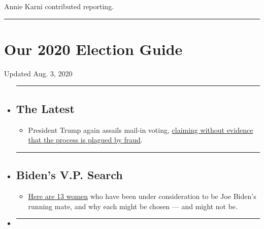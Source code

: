 Annie Karni contributed reporting.

\begin{center}\rule{0.5\linewidth}{\linethickness}\end{center}

\hypertarget{our-2020-election-guide}{%
\section{Our 2020 Election Guide}\label{our-2020-election-guide}}

Updated Aug. 3, 2020

\begin{itemize}
\item
  \begin{center}\rule{0.5\linewidth}{\linethickness}\end{center}

  \hypertarget{the-latest}{%
  \subsection{The Latest}\label{the-latest}}

  \begin{itemize}
  \tightlist
  \item
    President Trump again assails mail-in voting,
    \href{https://www.nytimes.com/2020/08/03/us/politics/trump-mail-in-voting.html?action=click\&pgtype=Article\&state=default\&region=BELOW_MAIN_CONTENT\&context=storylines_guide}{claiming
    without evidence that the process is plagued by fraud}.
  \end{itemize}
\item
  \begin{center}\rule{0.5\linewidth}{\linethickness}\end{center}

  \hypertarget{bidens-vp-search}{%
  \subsection{Biden's V.P. Search}\label{bidens-vp-search}}

  \begin{itemize}
  \tightlist
  \item
    \href{https://www.nytimes.com/article/biden-vice-president-2020.html?action=click\&pgtype=Article\&state=default\&region=BELOW_MAIN_CONTENT\&context=storylines_guide}{Here
    are 13 women} who have been under consideration to be Joe Biden's
    running mate, and why each might be chosen --- and might not be.
  \end{itemize}
\item
  \begin{center}\rule{0.5\linewidth}{\linethickness}\end{center}


\end{itemize}
